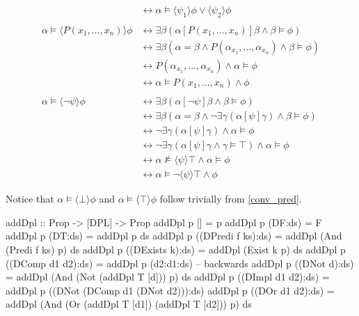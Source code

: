 \documentclass[12pt]{article}
\begin{document}
\begin{align}
 & \leftrightarrow \alpha\models\langle\psi_1\rangle\phi \vee \langle\psi_2\rangle\phi \label{conv_or}\\\nonumber\\
%
\alpha\models\langle P(x_1,\dots,x_n)\rangle\phi
 & \leftrightarrow \exists\beta (\alpha[P(x_1,\dots,x_n)]\beta \wedge \beta\models\phi) \nonumber\\
 & \leftrightarrow \exists\beta (\alpha = \beta \wedge P(\alpha_{x_1},\dots,\alpha_{x_n}) \wedge \beta\models\phi) \nonumber\\
 & \leftrightarrow P(\alpha_{x_1},\dots,\alpha_{x_n}) \wedge \alpha\models\phi \nonumber\\
 & \leftrightarrow \alpha\models P(x_1,\dots,x_n) \wedge \phi \label{conv_pred}\\\nonumber\\
%
\alpha\models\langle\neg\psi\rangle\phi
 & \leftrightarrow \exists\beta (\alpha[\neg\psi]\beta \wedge \beta\models\phi) \nonumber\\
 & \leftrightarrow \exists\beta (\alpha=\beta \wedge \neg\exists\gamma(\alpha[\psi]\gamma) \wedge \beta\models\phi) \nonumber\\
 & \leftrightarrow \neg\exists\gamma(\alpha[\psi]\gamma) \wedge \alpha\models\phi \nonumber\\
 & \leftrightarrow \neg\exists\gamma(\alpha[\psi]\gamma \wedge \gamma\models\top) \wedge \alpha\models\phi \nonumber\\
 & \leftrightarrow \alpha\not\models\langle\psi\rangle\top \wedge \alpha\models\phi \nonumber\\
 & \leftrightarrow \alpha\models \neg\langle\psi\rangle\top \wedge \phi \label{conv_neg}
\end{align}

Notice that $\alpha\models\langle\bot\rangle\phi$ and $\alpha\models\langle\top\rangle\phi$ follow trivially from \eqref{conv_pred}.

\begin{haskell}
addDpl :: Prop -> [DPL] -> Prop
addDpl p [] = p
addDpl p (DF:ds) = F
addDpl p (DT:ds) = addDpl p ds
addDpl p ((DPredi f ks):ds) = addDpl (And (Predi f ks) p) ds
addDpl p ((DExists k):ds) = addDpl (Exist k p) ds
addDpl p ((DComp d1 d2):ds) = addDpl p (d2:d1:ds) -- backwards
addDpl p ((DNot d):ds) = addDpl (And (Not (addDpl T [d])) p) ds
addDpl p ((DImpl d1 d2):ds) = addDpl p ((DNot (DComp d1 (DNot d2))):ds)
addDpl p ((DOr d1 d2):ds) = addDpl (And (Or (addDpl T [d1]) (addDpl T [d2])) p) ds
\end{haskell}
\end{document}
